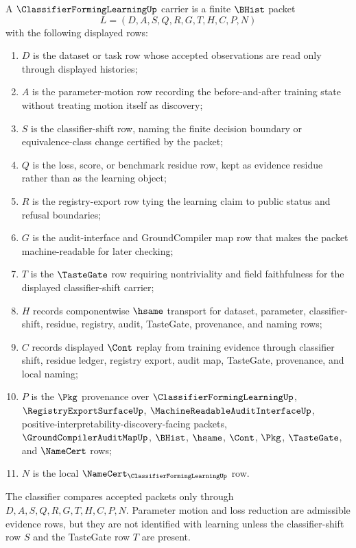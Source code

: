 \begin{definition}
\label{def:classifier-forming-learning-carrier}
A $\ClassifierFormingLearningUp$ carrier is a finite $\BHist$ packet
$$
L=(D,A,S,Q,R,G,T,H,C,P,N)
$$
with the following displayed rows:
\begin{enumerate}
\item $D$ is the dataset or task row whose accepted observations are read only
  through displayed histories;
\item $A$ is the parameter-motion row recording the before-and-after training
  state without treating motion itself as discovery;
\item $S$ is the classifier-shift row, naming the finite decision boundary or
  equivalence-class change certified by the packet;
\item $Q$ is the loss, score, or benchmark residue row, kept as evidence
  residue rather than as the learning object;
\item $R$ is the registry-export row tying the learning claim to public
  status and refusal boundaries;
\item $G$ is the audit-interface and GroundCompiler map row that makes the
  packet machine-readable for later checking;
\item $T$ is the $\TasteGate$ row requiring nontriviality and field
  faithfulness for the displayed classifier-shift carrier;
\item $H$ records componentwise $\hsame$ transport for dataset, parameter,
  classifier-shift, residue, registry, audit, TasteGate, provenance, and
  naming rows;
\item $C$ records displayed $\Cont$ replay from training evidence through
  classifier shift, residue ledger, registry export, audit map, TasteGate,
  provenance, and local naming;
\item $P$ is the $\Pkg$ provenance over $\ClassifierFormingLearningUp$,
  $\RegistryExportSurfaceUp$, $\MachineReadableAuditInterfaceUp$,
  positive-interpretability-discovery-facing packets,
  $\GroundCompilerAuditMapUp$, $\BHist$, $\hsame$, $\Cont$, $\Pkg$,
  $\TasteGate$, and $\NameCert$ rows;
\item $N$ is the local $\NameCert_{\ClassifierFormingLearningUp}$ row.
\end{enumerate}
The classifier compares accepted packets only through
$D,A,S,Q,R,G,T,H,C,P,N$. Parameter motion and loss reduction are admissible
evidence rows, but they are not identified with learning unless the
classifier-shift row $S$ and the TasteGate row $T$ are present.
\end{definition}


